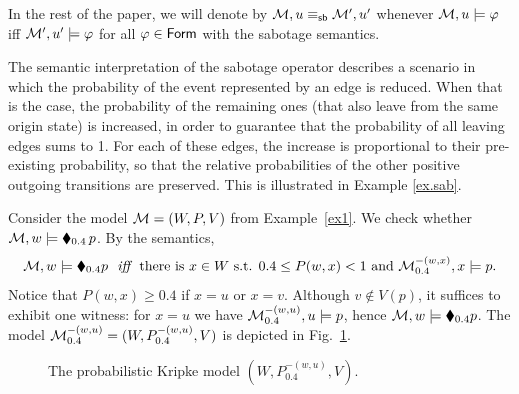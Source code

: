 In the rest of the paper, we will denote  by $\mathcal{M} , u \equiv_{\mathsf{sb}} \mathcal{M}' , u'$ whenever $\mathcal{M} , u \models \varphi$ iff $\mathcal{M}' , u' \models \varphi$ for all $\varphi \in \mathsf{Form} $ with the sabotage semantics.

\medskip

The semantic interpretation of the sabotage operator describes a scenario in which the probability of the event represented by an edge is reduced. When that is the case, the probability of the remaining ones (that also leave from the same origin state) is increased, in order to guarantee that the probability of all leaving edges sums to 1. For each of these edges, the increase is proportional to their pre-existing probability, so that the relative probabilities of the other positive outgoing transitions are preserved. This is illustrated in Example \ref{ex.sab}.


\begin{example} \label{ex.sab}
Consider the model $\mathcal{M}=(W,P,V)$ from Example~\ref{ex1}. We check whether
$\mathcal{M},w\models\blacklozenge_{0.4}\,p$. By the semantics,
\[
  \model,w\models\blacklozenge_{0.4}p \ \
  \iff \ \ 
  \text{there is } x\in W \text{ s.t. } 0.4\leq P(w,x)<1
  \text{ and } \model^{-(w,x)}_{0.4},x\models p .
\]
Notice that $P(w,x)\geq 0.4$ if $x=u$ or $x=v$. Although $v\notin V(p)$,
it suffices to exhibit one witness: for $x=u$ we have
$\mathcal{M}^{-(w,u)}_{0.4},u\models p$, hence $\mathcal{M},w\models\blacklozenge_{0.4}p$.
The model $\mathcal{M}^{-(w,u)}_{0.4}=(W,P^{-(w,u)}_{0.4},V)$ is depicted in
Fig.~\ref{fig:sabotage}.

\begin{figure}[!ht]
    \centering
    \caption{The probabilistic Kripke model $(W,P^{-(w,u)}_{0.4},V)$.}
    \label{fig:sabotage}
\end{figure}
\end{example}

